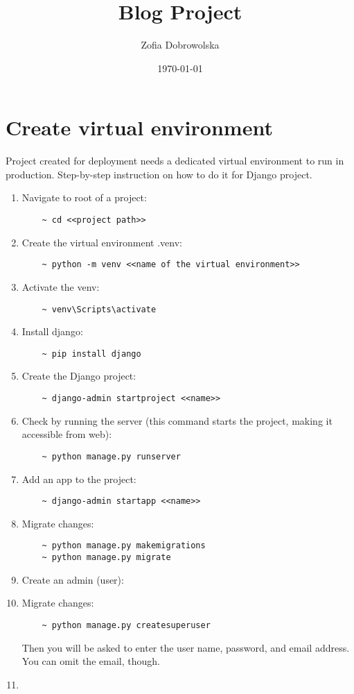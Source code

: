 \documentclass[12pt,a4paper]{article}
\begin{document}
\title{Blog Project}

\author{Zofia Dobrowolska}

\date{\today}

\maketitle

\section{Create virtual environment}
Project created for deployment needs a dedicated virtual environment to run in production. Step-by-step instruction on how to do it for Django project.\\
\begin{enumerate}
\item Navigate to root of a project:
	\begin{verbatim}
	~ cd <<project path>>
	\end{verbatim}
\item Create the virtual environment .venv:
	\begin{verbatim}
	~ python -m venv <<name of the virtual environment>>
	\end{verbatim}
\item Activate the venv:
	\begin{verbatim}
	~ venv\Scripts\activate
	\end{verbatim}
\item Install django:
	\begin{verbatim}
	~ pip install django
	\end{verbatim}
\item Create the Django project:
	\begin{verbatim}
	~ django-admin startproject <<name>>
	\end{verbatim}
\item Check by running the server (this command starts the project, making it accessible from web):
	\begin{verbatim}
	~ python manage.py runserver	
	\end{verbatim}
\item Add an app to the project:
	\begin{verbatim}
	~ django-admin startapp <<name>>	
	\end{verbatim}
\item Migrate changes:
	\begin{verbatim}
	~ python manage.py makemigrations
	~ python manage.py migrate
	\end{verbatim}
\item Create an admin (user):
\item Migrate changes:
	\begin{verbatim}
	~ python manage.py createsuperuser
	\end{verbatim}
Then you will be asked to enter the user name, password, and email address. You can omit the email, though.
\item
\end{enumerate}
\end{document}
